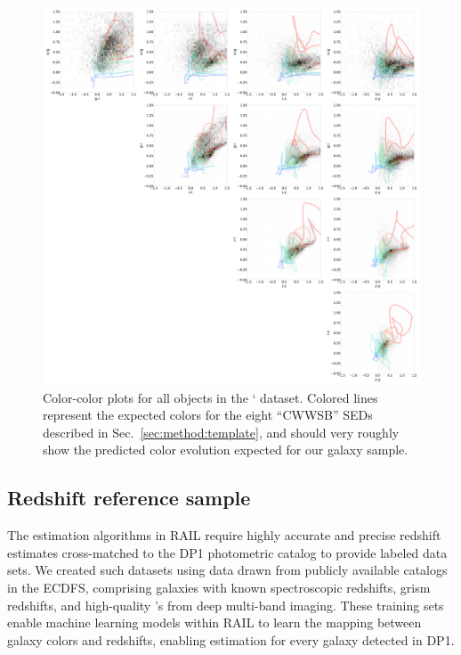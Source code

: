 \begin{figure}
    \centering
    \includegraphics[width=\linewidth]{figures/color_v_color.pdf}
    \caption{Color-color plots for all objects in the ` dataset.  Colored lines represent the expected colors for the eight ``CWWSB'' SEDs described in Sec.~\ref{sec:method:template}, and should very roughly show the predicted color evolution expected for our galaxy sample.}
    \label{fig:dp_color_v_color}
\end{figure}

\pagebreak

\subsection{Redshift reference sample}
\label{sec:data:reference}

The \photoz estimation algorithms in RAIL require highly accurate and precise redshift estimates cross-matched to the DP1 photometric catalog to provide labeled  data sets.  We created such datasets using data drawn from publicly available catalogs in the ECDFS, comprising galaxies with known spectroscopic redshifts, grism redshifts, and high-quality \photoz's from deep multi-band imaging.  These training sets enable machine learning models within RAIL to learn the mapping between galaxy colors and redshifts, enabling \photoz estimation for every galaxy detected in DP1.

